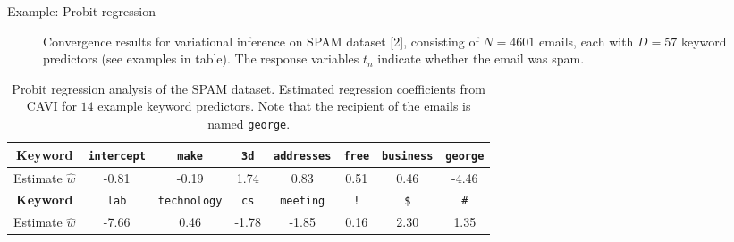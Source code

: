 \documentclass[final]{beamer}
\newlength{\twocolwid}
\begin{document}
\begin{frame}[t]
\begin{columns}[t]
\begin{column}{\twocolwid}
\begin{block}{Example: Probit regression}
\begin{figure}[h]
\begin{subfigure}[t]{0.49\textwidth}
    \end{subfigure}
    \caption{Convergence results for variational inference on SPAM dataset [2], consisting of $N= 4601$ emails, each with $D=57$ keyword predictors (see examples in table). The response variables $t_n$ indicate whether the email was spam.} %
\end{figure}

\vspace{-.5em}

\begin{table}
\begin{tabular}{c | c | c | c | c | c | c | c}
\toprule
\toprule
\textbf{Keyword} & \texttt{intercept} & \texttt{make} & \texttt{3d} & \texttt{addresses} & \texttt{free} & \texttt{business} & \texttt{george} \\
\midrule
Estimate $\widehat w$ & -0.81 & -0.19 & 1.74 & 0.83 & 0.51 & 0.46 & -4.46\\
\midrule
\textbf{Keyword} & \texttt{lab} & \texttt{technology} & \texttt{cs} & \texttt{meeting} & \texttt{!} & \texttt{\$} & \texttt{\#} \\
\midrule
Estimate $\widehat w$ & -7.66 & 0.46 & -1.78 & -1.85 & 0.16 & 2.30 & 1.35\\
\bottomrule
\bottomrule
\end{tabular}

\vspace{.5em}

\caption{Probit regression analysis of the SPAM dataset. Estimated regression coefficients from CAVI for $14$ example keyword predictors. Note that the recipient of the emails is named \texttt{george}.}
\end{table}




\end{block}




%
%
%


\end{column}
\end{columns}
\end{frame}
\end{document}
